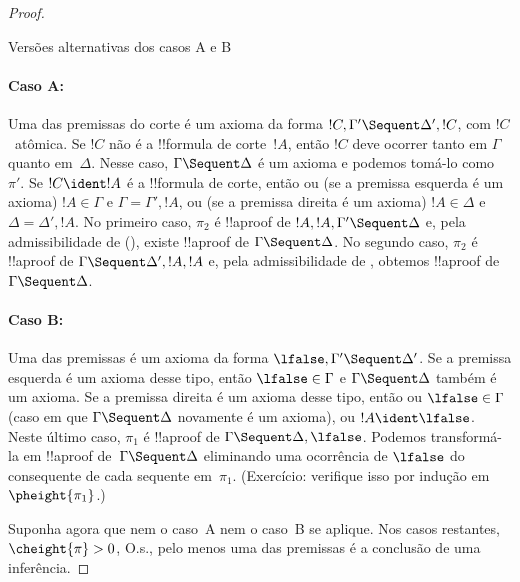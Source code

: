 \documentclass[../../../include/open-logic-section]{subfiles}
\begin{document}
\begin{proof}
\begin{center}
Versões alternativas dos casos A e B
\end{center}

\paragraph{Caso A:} Uma das premissas do corte é um axioma da forma
$!C, \Gamma' \Sequent \Delta', !C$, com $!C$~atômica. Se $!C$ não é a
!!{formula} de corte~$!A$, então $!C$ deve ocorrer tanto em $\Gamma$
quanto em~$\Delta$. Nesse caso, $\Gamma \Sequent \Delta$ é um axioma e
podemos tomá-lo como~$\pi'$. Se $!C \ident !A$ é a !!{formula} de corte,
então ou (se a premissa esquerda é um axioma) $!A \in \Gamma$ e $\Gamma
= \Gamma', !A$, ou (se a premissa direita é um axioma) $!A \in \Delta$
e $\Delta = \Delta', !A$. No primeiro caso, $\pi_2$ é !!a{proof} de $!A,
!A, \Gamma' \Sequent \Delta$ e, pela admissibilidade de
\LeftR{\Contraction} (), existe
!!a{proof} de $\Gamma \Sequent \Delta$. No segundo caso, $\pi_2$ é
!!a{proof} de $\Gamma \Sequent \Delta', !A, !A$ e, pela admissibilidade
de \RightR{\Contraction}, obtemos !!a{proof} de $\Gamma \Sequent
\Delta$.

\paragraph{Caso B:} Uma das premissas é um axioma da forma
$\lfalse, \Gamma' \Sequent \Delta'$. Se a premissa esquerda é um axioma
desse tipo, então $\lfalse \in \Gamma$ e $\Gamma \Sequent \Delta$
também é um axioma. Se a premissa direita é um axioma desse tipo, então
ou $\lfalse \in \Gamma$ (caso em que $\Gamma \Sequent \Delta$ novamente
é um axioma), ou $!A \ident \lfalse$. Neste último caso, $\pi_1$ é
!!a{proof} de $\Gamma \Sequent \Delta, \lfalse$. Podemos transformá-la
em !!a{proof} de~$\Gamma \Sequent \Delta$ eliminando uma ocorrência de
$\lfalse$ do consequente de cada sequente em~$\pi_1$. (Exercício:
verifique isso por indução em~$\pheight{\pi_1}$.)

Suponha agora que nem o caso~A nem o caso~B se aplique. Nos casos
restantes, $\cheight{\pi} > 0$, O.s.\@, pelo menos uma das premissas é a
conclusão de uma inferência.


\end{proof}
\end{document}
